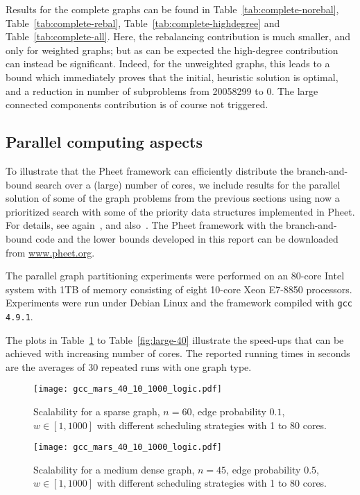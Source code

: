 \documentclass[a4paper,11pt]{article}
\begin{document}
Results for the complete graphs can be found in
Table~\ref{tab:complete-norebal}, Table~\ref{tab:complete-rebal},
Table~\ref{tab:complete-highdegree} and Table~\ref{tab:complete-all}.
Here, the rebalancing contribution is much smaller, and only for
weighted graphs; but as can be expected the high-degree contribution
can instead be significant. Indeed, for the unweighted graphs, this
leads to a bound which immediately proves that the initial, heuristic
solution is optimal, and a reduction in number of subproblems from
20058299 to 0. The large connected components contribution is of
course not triggered.

\subsection{Parallel computing aspects}

To illustrate that the Pheet framework can efficiently distribute the
branch-and-bound search over a (large) number of cores, we include
results for the parallel solution of some of the graph problems from
the previous sections using now a prioritized search with some of the
priority data structures implemented in Pheet. For details, see
again~\cite{Wimmer14:diss}, and
also~\cite{Traff13:priosched,Traff13:stratcorr}. The Pheet framework
with the branch-and-bound code and the lower bounds developed in this
report can be downloaded from \url{www.pheet.org}.

The parallel graph partitioning experiments were performed on an
80-core Intel system with 1TB of memory consisting of eight 10-core
Xeon E7-8850 processors. Experiments were run under Debian Linux and
the framework compiled with \texttt{gcc 4.9.1}.

The plots in Table~\ref{fig:sparse-60} to Table~\ref{fig:large-40}
illustrate the speed-ups that can be achieved with increasing number
of cores. The reported running times in seconds are the averages of 30
repeated runs with one graph type.

\begin{figure}
  \texttt{[image: gcc\_mars\_40\_10\_1000\_logic.pdf]}
\caption{Scalability for a sparse graph, $n=60$, edge probability
  $0.1$, $w\in [1,1000]$ with different scheduling strategies with
  1 to 80 cores.}
\label{fig:sparse-60}
\end{figure}

\begin{figure}
  \texttt{[image: gcc\_mars\_40\_10\_1000\_logic.pdf]}
\caption{Scalability for a medium dense graph, $n=45$, edge probability
  $0.5$, $w\in [1,1000]$ with different scheduling strategies with
  1 to 80 cores.}
\label{fig:medium-45}
\end{figure}
\end{document}
